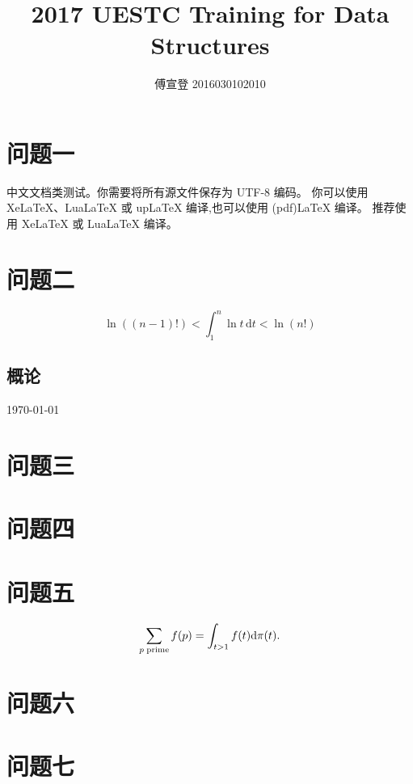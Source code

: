 \documentclass[fontset=windowsnew,zihao=-4,scheme=chinese,punct=quanjiao,linespread=1,UTF8]{ctexart}
\begin{document}
\title{2017 UESTC Training for Data Structures}
\author{傅宣登 2016030102010}

\maketitle

\section{问题一}

中文文档类测试。你需要将所有源文件保存为 UTF-8 编码。
你可以使用 XeLaTeX、LuaLaTeX 或 upLaTeX 编译,也可以使用 (pdf)LaTeX 编译。
推荐使用 XeLaTeX 或 LuaLaTeX 编译。

\section{问题二}

\begin{equation}
  \ln((n-1)!) < \int_1^n \ln t\,\mathrm{d}t < \ln(n!)
\end{equation}

\subsection{概论}


\today \figurename

\section{问题三}


\section{问题四}

\section{问题五}
\[
  \sum_{p\rm\;prime}f(p) = \int_{t>1}f(t)\mathrm{d}\pi(t).
\]

\section{问题六}

\section{问题七}
\end{document}
